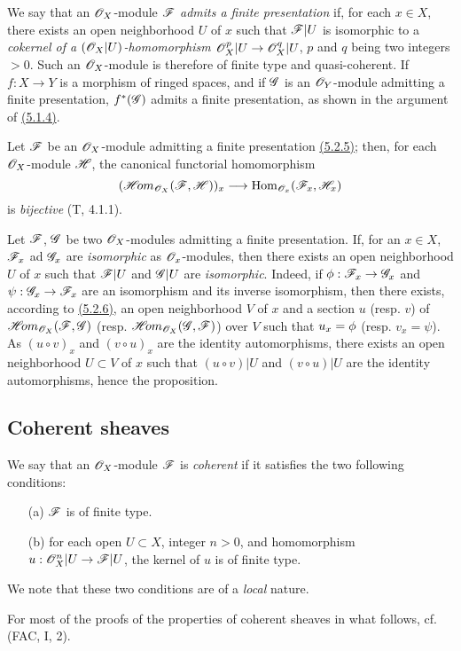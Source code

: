 \begin{env}[5.2.5]
\label{env-0.5.2.5}
We say that an $\mathscr{O}_X$-module $\mathscr{F}$ {\em admits a finite presentation} if, for each
$x\in X$, there exists an open neighborhood $U$ of $x$ such that $\mathscr{F}|U$ is isomorphic
to a {\em cokernel of a $(\mathscr{O}_X|U)$-homomorphism $\mathscr{O}_X^p|U\to\mathscr{O}_X^q|U$}, $p$ and $q$ being
two integers $>0$. Such an $\mathscr{O}_X$-module is therefore of finite type and quasi-coherent. If
$f:X\to Y$ is a morphism of ringed spaces, and if $\mathscr{G}$ is an $\mathscr{O}_Y$-module admitting a
finite presentation, $f^*(\mathscr{G})$ admits a finite presentation, as shown in the argument of
\hyperref[env-0.5.1.4]{(5.1.4)}.
\end{env}

\begin{env}[5.2.6]
\label{env-0.5.2.6}
Let $\mathscr{F}$ be an $\mathscr{O}_X$-module admitting a finite presentation \hyperref[env-0.5.2.5]{(5.2.5)}; then,
for each $\mathscr{O}_X$-module $\mathscr{H}$, the canonical functorial homomorphism
\[
  (\mathscr{H}\!{om}_{\mathscr{O}_X}(\mathscr{F},\mathscr{H}))_x\longrightarrow{\mathop{\mathrm{Hom}}\nolimits}_{\mathscr{O}_x}(\mathscr{F}_x,\mathscr{H}_x)
\]
is {\em bijective} (T, 4.1.1).
\end{env}

\begin{env}[5.2.7]
\label{env-0.5.2.7}
Let $\mathscr{F}$, $\mathscr{G}$ be two $\mathscr{O}_X$-modules admitting a finite presentation. If, for an
$x\in X$, $\mathscr{F}_x$ ad $\mathscr{G}_x$ are {\em isomorphic} as $\mathscr{O}_x$-modules, then there
exists an open neighborhood $U$ of $x$ such that $\mathscr{F}|U$ and $\mathscr{G}|U$ are
{\em isomorphic}. Indeed, if $\phi:\mathscr{F}_x\to\mathscr{G}_x$ and $\psi:\mathscr{G}_x\to\mathscr{F}_x$ are
an isomorphism and its inverse isomorphism, then there exists, according to
\hyperref[env-0.5.2.6]{(5.2.6)}, an open neighborhood $V$ of $x$ and a section $u$ (resp. $v$) of
$\mathscr{H}\!{om}_{\mathscr{O}_X}(\mathscr{F},\mathscr{G})$ (resp. $\mathscr{H}\!{om}_{\mathscr{O}_X}(\mathscr{G},\mathscr{F})$) over $V$ such
that $u_x=\phi$ (resp. $v_x=\psi$). As $(u\circ v)_x$ and $(v\circ u)_x$ are the identity
automorphisms, there exists an open neighborhood $U\subset V$ of $x$ such that $(u\circ v)|U$
and $(v\circ u)|U$ are the identity automorphisms, hence the proposition.
\end{env}

\subsection{Coherent sheaves}
\label{subsection-coh-sheaves}

\begin{env}[5.3.1]
\label{env-0.5.3.1}
We say that an $\mathscr{O}_X$-module $\mathscr{F}$ is {\em coherent} if it satisfies the two following
conditions:
\begin{itemize}
  \item[(a)] $\mathscr{F}$ is of finite type.
  \item[(b)] for each open $U\subset X$, integer $n>0$, and homomorphism $u:\mathscr{O}_X^n|U\to\mathscr{F}|U$,
    the kernel of $u$ is of finite type.
\end{itemize}
We note that these two conditions are of a {\em local} nature.

For most of the proofs of the properties of coherent sheaves in what follows,
cf. (FAC, I, 2).
\end{env}

